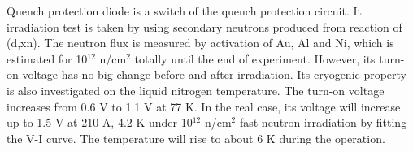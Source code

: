 \documentclass[a4paper, 10pt, twocolumn]{article}
\begin{document}
Quench protection diode is a switch of the quench protection circuit.
It irradiation test is taken by using secondary neutrons produced from reaction of (d,xn).
The neutron flux is measured by activation of Au, Al and Ni, which is estimated for 10$^{12}$ n/cm$^2$ totally until the end of experiment.
However, its turn-on voltage has no big change before and after irradiation.
Its cryogenic property is also investigated on the liquid nitrogen temperature.
The turn-on voltage increases from 0.6 V to 1.1 V at 77 K.
In the real case, its voltage will increase up to 1.5 V at 210 A, 4.2 K under 10$^{12}$ n/cm$^2$ fast neutron irradiation by fitting the V-I curve.
The temperature will rise to about 6 K during the operation.
%
\end{document}

